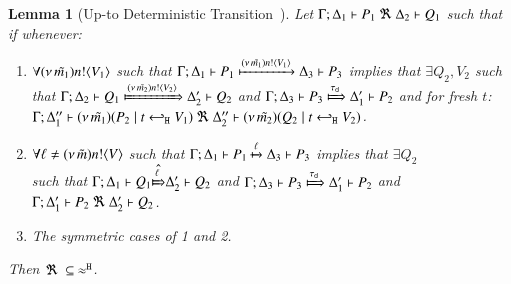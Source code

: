 \documentclass[preprint,11pt]{elsarticle}
\newtheorem{lemma}{Lemma}[section]
\begin{document}
{{\begin{lemma}[Up-to Deterministic Transition~\cite{KouzapasPY17}]%
	\label{lem:up_to_deterministic_transition}
	Let $\Gamma; \Delta_1 \vdash P_1 \ \Re\  \Delta_2 \vdash Q_1$ such
	that if whenever:
%
	\begin{enumerate}[1.]
		\item	$\forall (\nu\, \tilde{m_1}) n ! \langle V_1 \rangle$ such that
			$
				\Gamma; \Delta_1 \vdash P_1 \xmapsto{(\nu\, \tilde{m_1}) n !\langle V_1 \rangle} \Delta_3 \vdash P_3
			$
			implies that $\exists Q_2, V_2$ such that
			$
				\horel{\Gamma}{\Delta_2}{Q_1}{\Hby{\news{\tilde{m_2}} \bactout{n}{V_2}}}{\Delta_2'}{Q_2}
			$
			and
			$
				\horel{\Gamma}{\Delta_3}{P_3}{\Hby{\dtau}}{\Delta_1'}{P_2}
			$
			and for fresh $t$:\\
			$
				\Gamma; \Delta_1'' \vdash (\nu\, \tilde{m_1})(P_2 \;|\; t \hookleftarrow_{\mathtt{H}} V_1) \ \Re\  \Delta_2'' \vdash{(\nu\, \tilde{m_2})(Q_2 \;|\;t \hookleftarrow_{\mathtt{H}} V_2)}
			$.
%
		\item	$\forall \ell \not= (\nu\, \tilde{m}) n ! \langle V \rangle$ such that
			$
				\Gamma; \Delta_1 \vdash P_1 \xmapsto{\ell} \Delta_3 \vdash P_3
			$
			implies that $\exists Q_2$  \\ such that 
			$
				\horel{\Gamma}{\Delta_1}{Q_1}{\hat{\Hby{\ell}}}{\Delta_2'}{Q_2}
			$
			and
			$
				\horel{\Gamma}{\Delta_3}{P_3}{\Hby{\dtau}}{\Delta_1'}{P_2}
			$
			and
			$\Gamma; \Delta_1' \vdash P_2 \ \Re\  \Delta_2' \vdash Q_2$.

		\item	The symmetric cases of 1 and 2.
	\end{enumerate}
	Then $\Re\ \subseteq\ \approx^\mathtt{H}$.
\end{lemma}



}}
\end{document}

